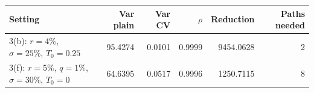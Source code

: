 \begin{tabular}{lrrrrr}
\toprule
Setting & Var plain & Var CV & $\rho$ & Reduction & Paths needed \\
\midrule
3(b): $r=4\%$, $\sigma=25\%$, $T_0=0.25$ & 95.4274 & 0.0101 & 0.9999 & 9454.0628 & 2 \\
3(f): $r=5\%$, $q=1\%$, $\sigma=30\%$, $T_0=0$ & 64.6395 & 0.0517 & 0.9996 & 1250.7115 & 8 \\
\bottomrule
\end{tabular}

